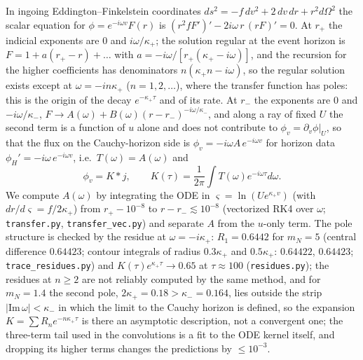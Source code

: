 \documentclass[11pt]{article}
\begin{document}
In ingoing Eddington--Finkelstein coordinates $ds^2=-f\,dv^2+2\,dv\,dr+r^2d\Omega^2$ the scalar equation for $\phi=e^{-i\omega v}F(r)$ is $(r^2fF')'-2i\omega\,r\,(rF)'=0$. At $r_+$ the indicial exponents are $0$ and $i\omega/\kappa_+$; the solution regular at the event horizon is $F=1+a(r_+-r)+\dots$ with $a=-i\omega/[r_+(\kappa_+-i\omega)]$, and the recursion for the higher coefficients has denominators $n(\kappa_+n-i\omega)$, so the regular solution exists except at $\omega=-in\kappa_+$ ($n=1,2,\dots$), where the transfer function has poles: this is the origin of the decay $e^{-\kappa_+\tau}$ and of its rate. At $r_-$ the exponents are $0$ and $-i\omega/\kappa_-$, $F\to A(\omega)+B(\omega)(r-r_-)^{-i\omega/\kappa_-}$, and along a ray of fixed $U$ the second term is a function of $u$ alone and does not contribute to $\phi_v=\partial_v\phi|_U$, so that the flux on the Cauchy-horizon side is $\phi_v=-i\omega A\,e^{-i\omega v}$ for horizon data $\phi_H'=-i\omega\,e^{-i\omega v}$, i.e.\ $T(\omega)=A(\omega)$ and
\begin{equation}
\phi_v=K*j,\qquad K(\tau)=\frac1{2\pi}\int T(\omega)e^{-i\omega\tau}d\omega .
\label{eq:Kdef}
\end{equation}
We compute $A(\omega)$ by integrating the ODE in $\varsigma=\ln(Ue^{\kappa_+v})$ (with $dr/d\varsigma=f/2\kappa_+$) from $r_+-10^{-8}$ to $r-r_-\lesssim10^{-8}$ (vectorized RK4 over $\omega$; \texttt{transfer.py}, \texttt{transfer\_vec.py}) and separate $A$ from the $u$-only term. The pole structure is checked by the residue at $\omega=-i\kappa_+$: $R_1=0.6442$ for $m_N=5$ (central difference $0.64423$; contour integrals of radius $0.3\kappa_+$ and $0.5\kappa_+$: $0.64422$, $0.64423$; \texttt{trace\_residues.py}) and $K(\tau)e^{\kappa_+\tau}\to0.65$ at $\tau\approx100$ (\texttt{residues.py}); the residues at $n\ge2$ are not reliably computed by the same method, and for $m_N=1.4$ the second pole, $2\kappa_+=0.18>\kappa_-=0.164$, lies outside the strip $|\mathrm{Im}\,\omega|<\kappa_-$ in which the limit to the Cauchy horizon is defined, so the expansion $K=\sum R_ne^{-n\kappa_+\tau}$ is there an asymptotic description, not a convergent one; the three-term tail used in the convolutions is a fit to the ODE kernel itself, and dropping its higher terms changes the predictions by $\le10^{-3}$.
\end{document}
